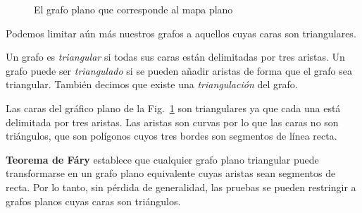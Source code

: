 \begin{figure}[t]
\begin{minipage}{.45\textwidth}
\begin{center}
\caption{El grafo plano que corresponde al mapa plano}\label{f.five-planar-graph-graph}
\end{center}
\end{minipage}
\end{figure}

Podemos limitar aún más nuestros grafos a aquellos cuyas caras son triangulares.

\begin{definition}
Un grafo es \emph{triangular} si todas sus caras están delimitadas por tres aristas. Un grafo puede ser \emph{triangulado} si se pueden añadir aristas de forma que el grafo sea triangular. También decimos que existe una \emph{triangulación} del grafo.
\end{definition}

\begin{example}
Las caras del gráfico plano de la Fig.~\ref{f.five-planar-graph-graph} son triangulares ya que cada una está delimitada por tres aristas. Las aristas son curvas por lo que las caras no son triángulos, que son polígonos cuyos tres bordes son segmentos de línea recta.
\end{example}

\begin{advanced}
\textbf{Teorema de F\'{a}ry} establece que cualquier grafo plano triangular puede transformarse en un grafo plano equivalente cuyas aristas sean segmentos de recta. Por lo tanto, sin pérdida de generalidad, las pruebas se pueden restringir a grafos planos cuyas caras son triángulos.
\end{advanced}

